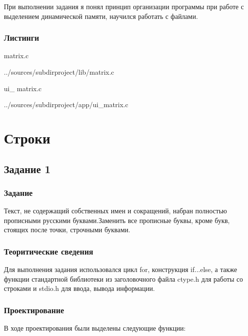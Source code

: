 \documentclass[12pt,a4paper]{report}
\begin{document}
При выполнении задания я понял принцип организации программы при работе с выделением динамической памяти, научился работать с файлами.

\subsection*{Листинги}

matrix.c

{../sources/subdirproject/lib/matrix.c}

\vspace{\baselineskip}

ui\_ matrix.c


{../sources/subdirproject/app/ui_matrix.c}


\chapter{Строки}
\section{Задание 1}
\subsection{Задание}

Текст, не содержащий собственных имен и сокращений, набран полностью прописными русскими буквами.Заменить все прописные буквы, кроме букв, стоящих после точки, строчными буквами.


\subsection{Теоритические сведения}

Для выполнения задания использовался цикл for, конструкция if...else, а также функции стандартной библиотеки из заголовочного файла ctype.h для  работы со строками и stdio.h для ввода, вывода информации.

\subsection{Проектирование}

В ходе проектирования были выделены следующие функции:
\end{document}
